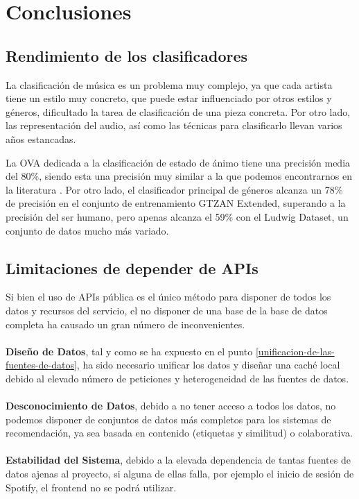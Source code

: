 
\section{Conclusiones}

\subsection{Rendimiento de los clasificadores}
La clasificación de música es un problema muy complejo, ya que cada artista tiene un estilo muy concreto, que puede estar influenciado por otros estilos y géneros, dificultado la tarea de clasificación de una pieza concreta. Por otro lado, las representación del audio, así como las técnicas para clasificarlo llevan varios años estancadas.

La OVA dedicada a la clasificación de estado de ánimo tiene una precisión media del 80\%, siendo esta una precisión muy similar a la que podemos encontrarnos en la literatura \cite{moods_classification}.
Por otro lado, el clasificador principal de géneros alcanza un 78\% de precisión en el conjunto de entrenamiento GTZAN Extended, superando a la precisión del ser humano, pero apenas alcanza el 59\% con el Ludwig Dataset, un conjunto de datos mucho más variado.\\


\subsection{Limitaciones de depender de APIs}
Si bien el uso de APIs pública es el único método para disponer de todos los datos y recursos del servicio, el no disponer de una base de la base de datos completa ha causado un gran número de inconvenientes.\\\\
\textbf{Diseño de Datos}, tal y como se ha expuesto en el punto \ref{unificacion-de-las-fuentes-de-datos}, ha sido necesario unificar los datos y diseñar una caché local debido al elevado número de peticiones y heterogeneidad de las fuentes de datos.\\\\
\textbf{Desconocimiento de Datos}, debido a no tener acceso a todos los datos, no podemos disponer de conjuntos de datos más completos para los sistemas de recomendación, ya sea basada en contenido (etiquetas y similitud) o colaborativa.\\\\
\textbf{Estabilidad del Sistema}, debido a la elevada dependencia de tantas fuentes de datos ajenas al proyecto, si alguna de ellas falla, por ejemplo el inicio de sesión de Spotify, el frontend no se podrá utilizar.



